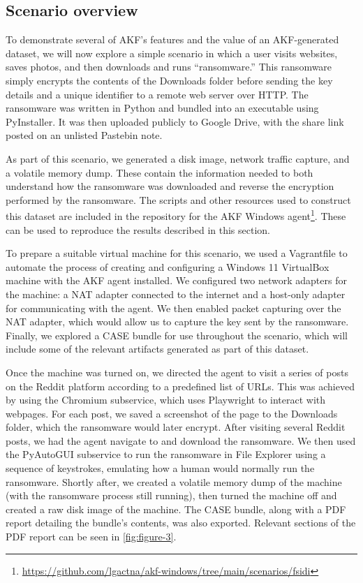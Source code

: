 \documentclass[preprint,12pt]{elsarticle}
\begin{document}
\subsection{Scenario overview}\label{scenario-overview}

To demonstrate several of AKF's features and the value of an
AKF-generated dataset, we will now explore a simple scenario in which a
user visits websites, saves photos, and then downloads and runs
``ransomware.'' This ransomware simply encrypts the contents of the
Downloads folder before sending the key details and a unique identifier
to a remote web server over HTTP. The ransomware was written in Python
and bundled into an executable using PyInstaller. It was then uploaded
publicly to Google Drive, with the share link posted on an unlisted
Pastebin note.

As part of this scenario, we generated a disk image, network traffic
capture, and a volatile memory dump. These contain the information
needed to both understand how the ransomware was downloaded and reverse
the encryption performed by the ransomware. The scripts and other
resources used to construct this dataset are included in the repository
for the AKF Windows agent\footnote{\url{https://github.com/lgactna/akf-windows/tree/main/scenarios/fsidi}}.
These can be used to reproduce the results described in this section.

To prepare a suitable virtual machine for this scenario, we used a
Vagrantfile to automate the process of creating and configuring a
Windows 11 VirtualBox machine with the AKF agent installed. We
configured two network adapters for the machine: a NAT adapter connected
to the internet and a host-only adapter for communicating with the
agent. We then enabled packet capturing over the NAT adapter, which
would allow us to capture the key sent by the ransomware. Finally, we
explored a CASE bundle for use throughout the scenario, which will
include some of the relevant artifacts generated as part of this
dataset.

Once the machine was turned on, we directed the agent to visit a series
of posts on the Reddit platform according to a predefined list of URLs.
This was achieved by using the Chromium subservice, which uses
Playwright to interact with webpages. For each post, we saved a
screenshot of the page to the Downloads folder, which the ransomware
would later encrypt. After visiting several Reddit posts, we had the
agent navigate to and download the ransomware. We then used the
PyAutoGUI subservice to run the ransomware in File Explorer using a
sequence of keystrokes, emulating how a human would normally run the
ransomware. Shortly after, we created a volatile memory dump of the
machine (with the ransomware process still running), then turned the
machine off and created a raw disk image of the machine. The CASE
bundle, along with a PDF report detailing the bundle's contents, was
also exported. Relevant sections of the PDF report can be seen in
\autoref{fig:figure-3}.
\end{document}
